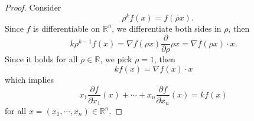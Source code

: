 \begin{Exercise}
\begin{proof}
Consider
$$
\quad \rho^k f(x) = f(\rho x).
$$
Since $f$ is differentiable on $\mathbb{R}^n$, we differentiate both sides in $\rho$, then
$$
k \rho^{k-1} f(x) 
= \nabla f(\rho x) \frac{\partial}{\partial \rho} \rho x
= \nabla f(\rho x)\cdot x.
$$
Since it holds for all $\rho\in\mathbb{R}$, we pick $\rho = 1$, then
$$
k f(x) = \nabla f(x)\cdot x
$$
which implies
$$
x_1\frac{\partial f}{\partial x_1}(x) + \cdots + x_n\frac{\partial f}{\partial x_n}(x) = k f(x)
$$
for all $x=(x_1,\cdots,x_n)\in\mathbb{R}^n$.
\end{proof}
\end{Exercise}